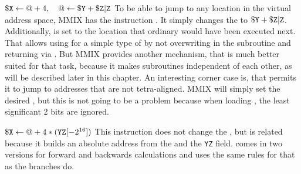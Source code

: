 \instrtbl
	{}
	{${\tt \$X} \leftarrow @+4,\quad @ \leftarrow {\tt \$Y} + {\tt \$Z}{\tt|Z}$}
\noindent To be able to jump to any location in the virtual address space, MMIX has the instruction . It simply changes the  to ${\tt \$Y} + {\tt \$Z}{\tt|Z}$. Additionally,  is set to the location that ordinary would have been executed next. That allows using  for a simple type of  by not overwriting  in the subroutine and returning via . But MMIX provides another mechanism, that is much better suited for that task, because it makes subroutines independent of each other, as will be described later in this chapter. An interesting corner case is, that  permits it to jump to addresses that are not tetra-aligned. MMIX will simply set the desired , but this is not going to be a problem because when loading , the least significant 2 bits are ignored. \citep[pg. 13]{mmix-doc}

\instrtbl
	{}
	{${\tt \$X} \leftarrow @+4*({\tt YZ}[-2^{16}])$}
\noindent This instruction does not change the , but is related because it builds an absolute address from the  and the {\tt YZ} field.  comes in two versions for forward and backwards calculations and uses the same rules for that as the branches do. \citep[pg. 13]{mmix-doc}

